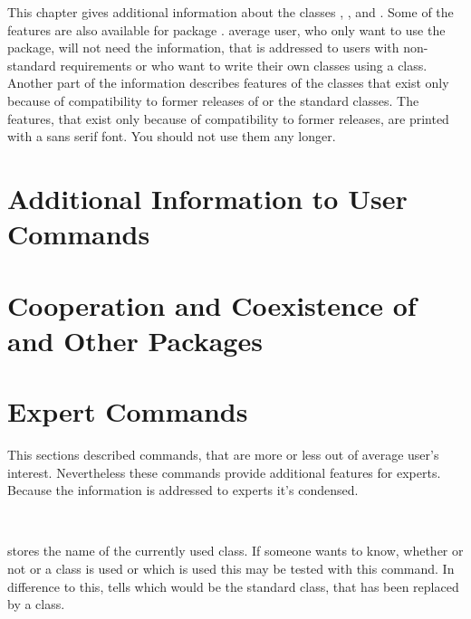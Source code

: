 This chapter gives additional information about the \KOMAScript{} classes
, , and . Some of the features
are also available for package .  average user, who only
want to use the package, will not need the information, that is addressed to
users with non-standard requirements or who want to write their own classes
using a \KOMAScript{} class. Another part of the information describes features
of the classes that exist only because of compatibility to former
releases of \KOMAScript{} or the standard classes. The features, that exist
only because of compatibility to former \KOMAScript{} releases, are printed
with a sans serif font. You should not use them any longer.


\section{Additional Information to User Commands}
\label{sec:maincls-experts.addInfos}



\section{Cooperation and Coexistence of \KOMAScript{} and Other Packages}
\label{sec:maincls-experts.coexistence}



\section{Expert Commands}
\label{sec:maincls-experts.experts}

This sections described commands, that are more or less out of average user's
interest. Nevertheless these commands provide additional features for
experts. Because the information is addressed to experts it's condensed.


\begin{Declaration}
  \\
\end{Declaration}
%
%
 stores the name of the currently used \KOMAScript{}
class. If someone wants to know, whether or not or a \KOMAScript{} class is
used or which \KOMAScript{} is used this may be tested with this command. In
difference to this,  tells which would be the standard class,
that has been replaced by a \KOMAScript{} class.

